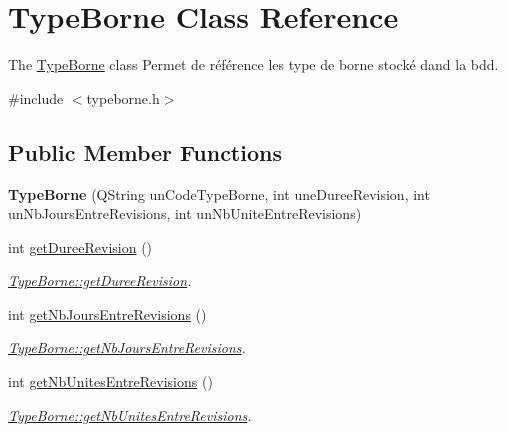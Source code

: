 \hypertarget{class_type_borne}{}\section{Type\+Borne Class Reference}
\label{class_type_borne}


The \hyperlink{class_type_borne}{Type\+Borne} class Permet de référence les type de borne stocké dand la bdd.  




{\ttfamily \#include $<$typeborne.\+h$>$}

\subsection*{Public Member Functions}
\begin{DoxyCompactItemize}
\item 
\mbox{\label{class_type_borne_a32f9c836b0f0b34e86a53520a8f23674}} 
{\bfseries Type\+Borne} (Q\+String un\+Code\+Type\+Borne, int une\+Duree\+Revision, int un\+Nb\+Jours\+Entre\+Revisions, int un\+Nb\+Unite\+Entre\+Revisions)
\item 
int \hyperlink{class_type_borne_aee58fc4a65b54cf00376c72df39ac0d9}{get\+Duree\+Revision} ()
\begin{DoxyCompactList}\small\item\em \hyperlink{class_type_borne_aee58fc4a65b54cf00376c72df39ac0d9}{Type\+Borne\+::get\+Duree\+Revision}. \end{DoxyCompactList}\item 
int \hyperlink{class_type_borne_a4921b40e0c20ec1c98ea167cb787e605}{get\+Nb\+Jours\+Entre\+Revisions} ()
\begin{DoxyCompactList}\small\item\em \hyperlink{class_type_borne_a4921b40e0c20ec1c98ea167cb787e605}{Type\+Borne\+::get\+Nb\+Jours\+Entre\+Revisions}. \end{DoxyCompactList}\item 
int \hyperlink{class_type_borne_aa99a6c098973997a77699bea1244a94f}{get\+Nb\+Unites\+Entre\+Revisions} ()
\begin{DoxyCompactList}\small\item\em \hyperlink{class_type_borne_aa99a6c098973997a77699bea1244a94f}{Type\+Borne\+::get\+Nb\+Unites\+Entre\+Revisions}. \end{DoxyCompactList}\end{DoxyCompactItemize}


